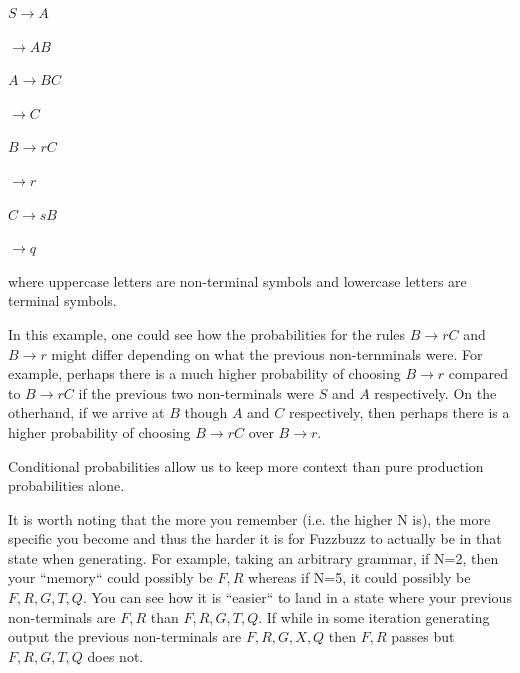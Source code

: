 \begin{center}
$S \rightarrow A$
\end{center}
\begin{center}
$\rightarrow A B$
\end{center}

\begin{center}
$A \rightarrow B C$
\end{center}
\begin{center}
$\rightarrow C$
\end{center}

\begin{center}
$B \rightarrow r C$
\end{center}
\begin{center}
$\rightarrow r$
\end{center}

\begin{center}
$C \rightarrow s B$
\end{center}
\begin{center}
$\rightarrow q$
\end{center}

where uppercase letters are non-terminal symbols and lowercase letters are
terminal symbols.


In this example, one could see how the probabilities for the rules $B
\rightarrow rC$ and $B \rightarrow r$ might differ depending on what the
previous non-ternminals were. For example, perhaps there is a much higher
probability of choosing $B \rightarrow r$ compared to $B \rightarrow rC$ if the
previous two non-terminals were $S$ and $A$ respectively. On the otherhand, if
we arrive at $B$ though $A$ and $C$ respectively, then perhaps there is a
higher probability of choosing $B \rightarrow rC$ over $B \rightarrow r$.

Conditional probabilities allow us to keep more context than pure production
probabilities alone.

It is worth noting that the more you remember (i.e. the higher N is), the more
specific you become and thus the harder it is for Fuzzbuzz to actually be in
that state when generating. For example, taking an arbitrary grammar, if N=2,
then your ``memory`` could possibly be $F, R$ whereas if N=5, it could possibly
be $F, R, G, T, Q$. You can see how it is ``easier`` to land in a state where
your previous non-terminals are $F, R$ than $F, R, G, T, Q$. If while in some
iteration generating output the previous non-terminals are $F, R, G, X, Q$ then
$F, R$ passes but $F, R, G, T, Q$ does not.

